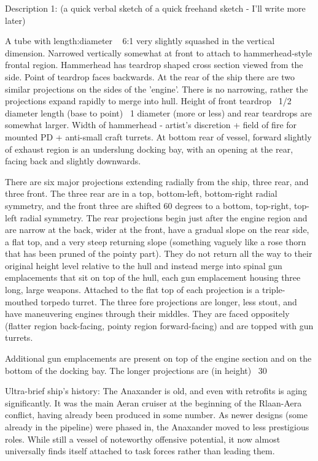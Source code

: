 Description 1: (a quick verbal sketch of a quick freehand sketch - I'll write more later)

A tube with length:diameter ~ 6:1 very slightly squashed in the vertical dimension. Narrowed vertically somewhat at front to attach to hammerhead-style frontal region. Hammerhead has teardrop shaped cross section viewed from the side. Point of teardrop faces backwards. At the rear of the ship there are two similar projections on the sides of the 'engine'. There is no narrowing, rather the projections expand rapidly to merge into hull. Height of front teardrop ~1/2 diameter length (base to point) ~1 diameter (more or less) and rear teardrops are somewhat larger. Width of hammerhead - artist's discretion + field of fire for mounted PD + anti-small craft turrets. At bottom rear of vessel, forward slightly of exhaust region is an underslung docking bay, with an opening at the rear, facing back and slightly downwards.

There are six major projections extending radially from the ship, three rear, and three front. The three rear are in a top, bottom-left, bottom-right radial symmetry, and the front three are shifted 60 degrees to a bottom, top-right, top-left radial symmetry. The rear projections begin just after the engine region and are narrow at the back, wider at the front, have a gradual slope on the rear side, a flat top, and a very steep returning slope (something vaguely like a rose thorn that has been pruned of the pointy part). They do not return all the way to their original height level relative to the hull and instead merge into spinal gun emplacements that sit on top of the hull, each gun emplacement housing three long, large weapons.  Attached to the flat top of each projection is a triple-mouthed torpedo turret. The three fore projections are longer, less stout, and have maneuvering engines through their middles. They are faced oppositely (flatter region back-facing, pointy region forward-facing) and are topped with gun turrets.

Additional gun emplacements are present on top of the engine section and on the bottom of the docking bay. The longer projections are (in height) ~30%

Ultra-brief ship's history:
The Anaxander is old, and even with retrofits is aging significantly. It was the main Aeran cruiser at the beginning of the Rlaan-Aera conflict, having already been produced in some number. As newer designs (some already in the pipeline) were phased in, the Anaxander moved to less prestigious roles. While still a vessel of noteworthy offensive potential, it now almost universally finds itself attached to task forces rather than leading them.



